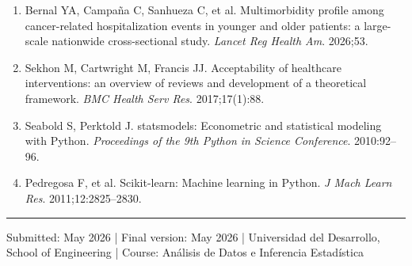 \documentclass[10pt,twocolumn]{article}
\begin{document}
\begin{enumerate}[leftmargin=16pt,label=\arabic*,itemsep=0pt,
    parsep=0pt,topsep=2pt,font=\small]
\item Bernal YA, Campaña C, Sanhueza C, et al. Multimorbidity profile among
  cancer-related hospitalization events in younger and older patients: a large-scale
  nationwide cross-sectional study. \textit{Lancet Reg Health Am}. 2026;53.

\item Sekhon M, Cartwright M, Francis JJ. Acceptability of healthcare interventions:
  an overview of reviews and development of a theoretical framework.
  \textit{BMC Health Serv Res}. 2017;17(1):88.

\item Seabold S, Perktold J. statsmodels: Econometric and statistical modeling with
  Python. \textit{Proceedings of the 9th Python in Science Conference}. 2010:92–96.

\item Pedregosa F, et al. Scikit-learn: Machine learning in Python.
  \textit{J Mach Learn Res}. 2011;12:2825–2830.

\end{enumerate}

\vspace{10pt}
\noindent\rule{\linewidth}{0.8pt}
{\fontsize{7.5}{9.5}\selectfont
Submitted: May 2026 \quad|\quad
Final version: May 2026 \quad|\quad
Universidad del Desarrollo, School of Engineering \quad|\quad
Course: Análisis de Datos e Inferencia Estadística
}
\end{document}
